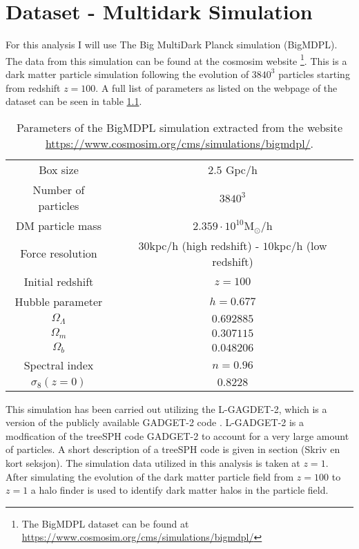 \chapter{Dataset - Multidark Simulation}
For this analysis I will use The Big MultiDark Planck simulation (BigMDPL)\cite{Multidark_dataset}. The data from this simulation can be found at the cosmosim website \footnote{The BigMDPL dataset can be found at \url{https://www.cosmosim.org/cms/simulations/bigmdpl/}}. This is a dark matter particle simulation following the evolution of $3840^3$ particles starting from redshift $z=100$. A full list of parameters as listed on the webpage of the dataset can be seen in table \ref{tab:cosmosimparameters}.
\begin{table}
    \begin{tabular}{| c | c |}
        \hline
        Box size & $2.5$ Gpc/h \\ 
        Number of particles& $3840^3$ \\  
        DM particle mass & $2.359\cdot10^{10} \mathrm{M}_\odot$/h \\
        Force resolution & $30$kpc/h (high redshift) - $10$kpc/h (low redshift)\\
        Initial redshift & $z = 100$\\
        Hubble parameter & $h=0.677$\\
        $\Omega_\Lambda$ & $0.692885$\\
        $\Omega_m$ & $ 0.307115$\\ 
        $ \Omega_b$ & $0.048206$ \\
        Spectral index & $n=0.96$\\
        $\sigma_8(z=0)$ & $0.8228$ \\
        \hline
    \end{tabular}
    \caption{\label{tab:cosmosimparameters}Parameters of the BigMDPL simulation extracted from the website \url{https://www.cosmosim.org/cms/simulations/bigmdpl/}.}
\end{table}
This simulation has been carried out utilizing the L-GAGDET-2, which is a version of the publicly available GADGET-2 code \cite{springel2005}. L-GADGET-2 is a modfication of the treeSPH\cite{treesph} code GADGET-2 to account for a very large amount of particles. A short description of a treeSPH code is given in section (Skriv en kort seksjon). The simulation data utilized in this analysis is taken at $z=1$. After simulating the evolution of the dark matter particle field from $z=100$ to $z=1$ a halo finder is used to identify dark matter halos in the particle field.

